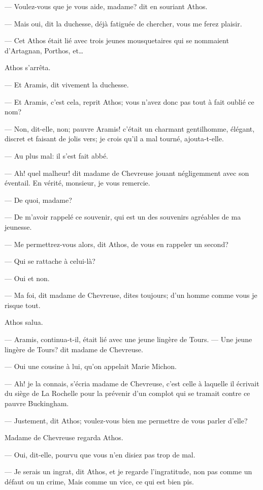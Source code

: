 — Voulez-vous que je vous aide, madame? dit en souriant Athos.

— Mais oui, dit la duchesse, déjà fatiguée de chercher, vous me ferez plaisir.

— Cet Athos était lié avec trois jeunes mousquetaires qui se nommaient d'Artagnan, Porthos, et\dots

Athos s'arrêta.

— Et Aramis, dit vivement la duchesse.

— Et Aramis, c'est cela, reprit Athos; vous n'avez donc pas tout à fait oublié ce nom?

— Non, dit-elle, non; pauvre Aramis! c'était un charmant gentilhomme, élégant, discret et faisant de jolis vers; je crois qu'il a mal tourné, ajouta-t-elle.

— Au plus mal: il s'est fait abbé.

— Ah! quel malheur! dit madame de Chevreuse jouant négligemment avec son éventail. En vérité, monsieur, je vous remercie.

— De quoi, madame?

— De m'avoir rappelé ce souvenir, qui est un des souvenirs agréables de ma jeunesse.

— Me permettrez-vous alors, dit Athos, de vous en rappeler un second?

— Qui se rattache à celui-là?

— Oui et non.

— Ma foi, dit madame de Chevreuse, dites toujours; d'un homme comme vous je risque tout.

Athos salua.

— Aramis, continua-t-il, était lié avec une jeune lingère de Tours.
— Une jeune lingère de Tours? dit madame de Chevreuse.

— Oui une cousine à lui, qu'on appelait Marie Michon.

— Ah! je la connais, s'écria madame de Chevreuse, c'est celle à laquelle il écrivait du siège de La Rochelle pour la prévenir d'un complot qui se tramait contre ce pauvre Buckingham.

— Justement, dit Athos; voulez-vous bien me permettre de vous parler d'elle?

Madame de Chevreuse regarda Athos.

— Oui, dit-elle, pourvu que vous n'en disiez pas trop de mal.

— Je serais un ingrat, dit Athos, et je regarde l'ingratitude, non pas comme un défaut ou un crime, Mais comme un vice, ce qui est bien pis.

